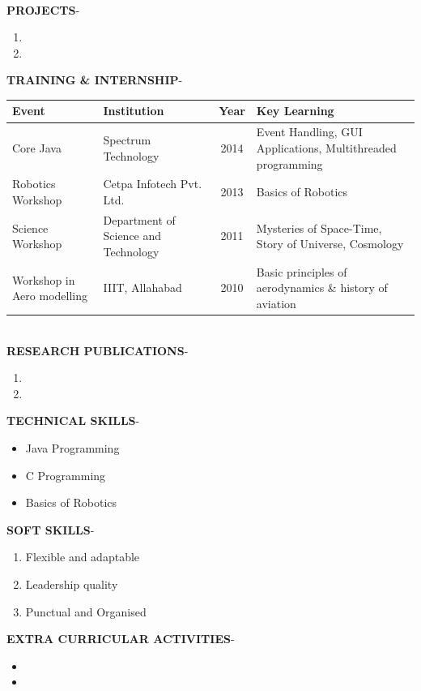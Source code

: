 \documentclass{article}
\begin{document}
	\\[\baselineskip]
	\textbf{PROJECTS}-
	\begin{enumerate}
		\item
		\item
	\end{enumerate}
	\textbf{TRAINING \& INTERNSHIP}- \\
	\begin{tabular}{|p{5cm}|p{5cm}|c|p{5cm}|}
		\hline
		\textbf{Event} & \textbf{Institution} & \textbf{Year} & \textbf{Key Learning}\\
		\hline
		Core Java & Spectrum Technology & 2014 & Event Handling, GUI Applications, Multithreaded programming \\
		\hline
		Robotics Workshop & Cetpa Infotech Pvt. Ltd. & 2013 & Basics of Robotics\\
		\hline
		Science Workshop & Department of Science and Technology & 2011 & Mysteries of Space-Time, Story of Universe, Cosmology\\
		\hline
		Workshop in Aero modelling & IIIT, Allahabad & 2010 & Basic principles of aerodynamics \& history of aviation\\
		\hline
	\end{tabular}
	\\[\baselineskip]
	\textbf{RESEARCH PUBLICATIONS}-
	\begin{enumerate}
		\item
		\item 
	\end{enumerate}
	\textbf{TECHNICAL SKILLS}-
	\begin{itemize}
		\item Java Programming
		\item C Programming
		\item Basics of Robotics \\[\baselineskip]
	\end{itemize}
	\newpage
	\textbf{SOFT SKILLS}-
	\begin{enumerate}
		\item Flexible and adaptable
		\item Leadership quality 
		\item Punctual and Organised \\[\baselineskip]
	\end{enumerate}
	\textbf{EXTRA CURRICULAR ACTIVITIES}-
	\begin{itemize}
		\item 
		\item
	\end{itemize}
\end{document}
